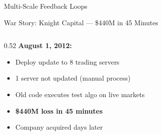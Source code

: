 \documentclass[aspectratio=169, 12pt]{beamer}
\begin{document}
\begin{frame}{Multi-Scale Feedback Loops}
\vspace{0.1cm}
\small
{}

\end{frame}

\begin{frame}{War Story: Knight Capital --- \$440M in 45 Minutes}
\note{
%
%
%
%
}

\small
\begin{columns}[T]
  \begin{column}{0.52\textwidth}
    \textbf{August 1, 2012:}
    \begin{itemize}\setlength\itemsep{0pt}
      \item Deploy update to 8 trading servers
      \item 1 server not updated (manual process)
      \item Old code executes test algo on live markets
      \item \textcolor{errorstroke}{\textbf{\$440M loss in 45 minutes}}
      \item Company acquired days later
    \end{itemize}


\end{column}
\end{columns}
\end{frame}
\end{document}
